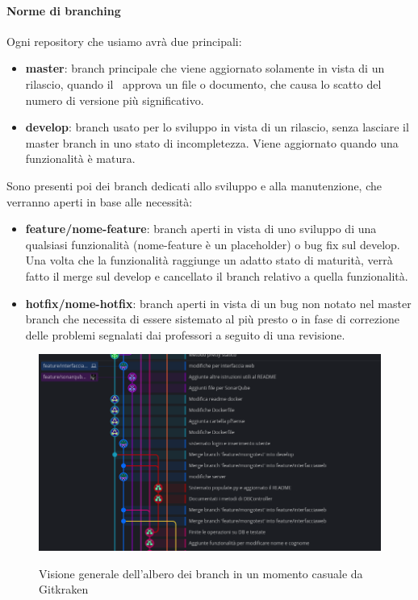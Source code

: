 			\paragraph{Norme di branching}
			Ogni repository che usiamo avrà due  principali:
			\begin{itemize}
				\item \textbf{master}: branch principale che viene aggiornato solamente in vista di un rilascio, quando il \Res\ approva un file o documento, che causa
					lo scatto del numero di versione più significativo.
				\item \textbf{develop}: branch usato per lo sviluppo in vista di un rilascio, senza lasciare il master branch in uno stato di incompletezza. Viene aggiornato
					quando una funzionalità è matura.
			\end{itemize}

			Sono presenti poi dei branch dedicati allo sviluppo e alla manutenzione, che verranno aperti in base alle necessità:
			\begin{itemize}
				\item \textbf{feature/nome-feature}: branch aperti in vista di uno sviluppo di una qualsiasi funzionalità (nome-feature è un placeholder) o bug fix sul develop.
					Una volta che la funzionalità raggiunge un adatto stato di maturità, verrà fatto il merge sul develop e cancellato il branch relativo a quella funzionalità.
				\item \textbf{hotfix/nome-hotfix}: branch aperti in vista di un bug non notato nel master branch che necessita di essere sistemato al più presto o in fase di
					correzione delle problemi segnalati dai professori a seguito di una revisione.
			\end{itemize}

			\begin{figure}[H]
				\centering
				\includegraphics[width=\textwidth]{img/branches.png}\\
				\caption[Albero dei branch da Gitkraken]{Visione generale dell'albero dei branch in un momento casuale da Gitkraken}
				\label{fig:butterfly}
			\end{figure}

